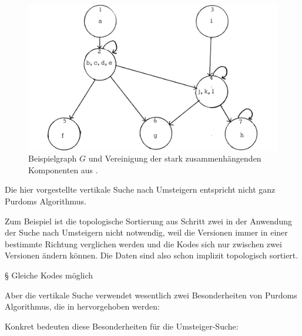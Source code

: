 \begin{figure}[H]
    \centering
    \includegraphics[width=.6\linewidth]{../img/purdom_g2.png}
    \caption{Beispielgraph $G$ und Vereinigung der stark zusammenhängenden Komponenten aus \cite[Seite 78]{purdom1970transitive}.}
\end{figure}

Die hier vorgestellte vertikale Suche nach Umsteigern entspricht nicht ganz Purdoms Algorithmus.

Zum Beispiel ist die topologische Sortierung aus Schritt zwei in der Anwendung der Suche nach Umsteigern nicht notwendig, weil die Versionen immer in einer bestimmte Richtung verglichen werden und die Kodes sich nur zwischen zwei Versionen ändern können. Die Daten sind also schon implizit topologisch sortiert. 

§ Gleiche Kodes möglich

Aber die vertikale Suche verwendet wesentlich zwei Besonderheiten von Purdoms Algorithmus, die in \cite[Seite 76f]{dar1993augmenting} hervorgehoben werden:

\begin{figure}[H]
    \centering
    \setlength{\fboxsep}{10pt}\color{black!20}
    \normalcolor%
\end{figure}

Konkret bedeuten diese Besonderheiten für die Umsteiger-Suche:

